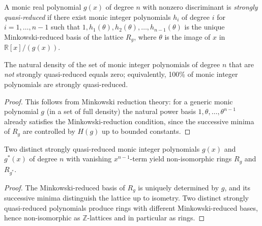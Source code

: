 
\begin{definition}
  \label{def:strongly_quasi_reduced}
  A monic real polynomial \(g(x)\) of degree \(n\) with nonzero
  discriminant is \emph{strongly quasi-reduced} if there exist monic
  integer polynomials \(h_i\) of degree \(i\) for
  \(i=1,\ldots,n-1\) such that
  \(1,h_1(\theta),h_2(\theta),\ldots,h_{n-1}(\theta)\) is the unique
  Minkowski-reduced basis of the lattice \(R_g\), where \(\theta\) is
  the image of \(x\) in \(\mathbb{R}[x]/(g(x))\).
\end{definition}

\begin{lemma}
  \label{lem:strongly_quasi_reduced_density}
  The natural density of the set of monic integer polynomials of
  degree \(n\) that are \emph{not} strongly quasi-reduced equals zero;
  equivalently, 100\% of monic integer polynomials are strongly
  quasi-reduced.
\end{lemma}
\begin{proof}
  This follows from Minkowski reduction theory: for a generic monic
  polynomial \(g\) (in a set of full density) the natural power basis
  \(1,\theta,\ldots,\theta^{n-1}\) already satisfies the
  Minkowski-reduction condition, since the successive minima of
  \(R_g\) are controlled by \(H(g)\) up to bounded constants.
\end{proof}

\begin{lemma}
  \label{lem:quasi_reduced_distinct}
  Two distinct strongly quasi-reduced monic integer polynomials
  \(g(x)\) and \(g^*(x)\) of degree \(n\) with vanishing
  \(x^{n-1}\)-term yield non-isomorphic rings \(R_g\) and
  \(R_{g^*}\).
\end{lemma}
\begin{proof}
  The Minkowski-reduced basis of \(R_g\) is uniquely determined by
  \(g\), and its successive minima distinguish the lattice up to
  isometry.  Two distinct strongly quasi-reduced polynomials produce
  rings with different Minkowski-reduced bases, hence non-isomorphic
  as \(\mathbb{Z}\)-lattices and in particular as rings.
\end{proof}

